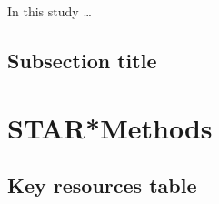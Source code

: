 In this study \ldots

\subsection{Subsection title}

\section{STAR*Methods}

\subsection{Key resources table}

